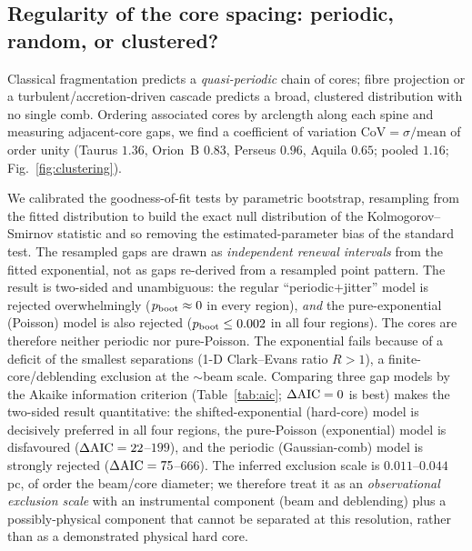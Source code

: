 \documentclass[usenatbib,twoside,twocolumn]{mnras}
\begin{document}
\subsection{Regularity of the core spacing: periodic, random, or clustered?}
\label{sec:clustering}
Classical fragmentation predicts a \emph{quasi-periodic} chain of cores; fibre projection or a turbulent/accretion-driven cascade predicts a broad, clustered distribution with no single comb. Ordering associated cores by arclength along each spine and measuring adjacent-core gaps, we find a coefficient of variation $\mathrm{CoV}=\sigma/\mathrm{mean}$ of order unity (Taurus $1.36$, Orion~B $0.83$, Perseus $0.96$, Aquila $0.65$; pooled $1.16$; Fig.~\ref{fig:clustering}).

We calibrated the goodness-of-fit tests by parametric bootstrap, resampling from the fitted distribution to build the exact null distribution of the Kolmogorov--Smirnov statistic and so removing the estimated-parameter bias of the standard test. The resampled gaps are drawn as \emph{independent renewal intervals} from the fitted exponential, not as gaps re-derived from a resampled point pattern. The result is two-sided and unambiguous: the regular ``periodic$+$jitter'' model is rejected overwhelmingly ($p_{\rm boot}\approx0$ in every region), \emph{and} the pure-exponential (Poisson) model is also rejected ($p_{\rm boot}\leq0.002$ in all four regions). The cores are therefore neither periodic nor pure-Poisson. The exponential fails because of a deficit of the smallest separations (1-D Clark--Evans ratio $R>1$), a finite-core/deblending exclusion at the $\sim$beam scale. Comparing three gap models by the Akaike information criterion (Table~\ref{tab:aic}; $\Delta{\rm AIC}=0$ is best) makes the two-sided result quantitative: the shifted-exponential (hard-core) model is decisively preferred in all four regions, the pure-Poisson (exponential) model is disfavoured ($\Delta{\rm AIC}=22$--$199$), and the periodic (Gaussian-comb) model is strongly rejected ($\Delta{\rm AIC}=75$--$666$). The inferred exclusion scale is $0.011$--$0.044$\,pc, of order the beam/core diameter; we therefore treat it as an \emph{observational exclusion scale} with an instrumental component (beam and deblending) plus a possibly-physical component that cannot be separated at this resolution, rather than as a demonstrated physical hard core.
\end{document}
